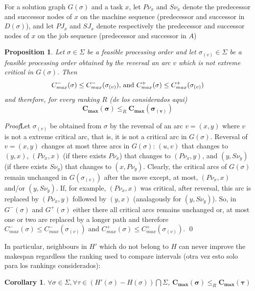 \documentclass[preprint]{elsarticle}
\newtheorem{proposition}{Proposition}
\newtheorem{corollary}{Corollary}
\begin{document}
For a solution graph $G(\sigma)$ and a task $x$, let $P\nu_x$ and $S\nu_x$ denote the predecessor and successor nodes of $x$ on the machine sequence (predecessor and successor in $D(\sigma)$), and let $PJ_x$ and $SJ_x$ denote respectively the predecessor and successor nodes of $x$ on the job sequence (predecessor and successor in $A$)

\begin{proposition}\label{propOutsideH2WorseCmax}
Let $\sigma \in \Sigma$ be a feasible processing order and let $\sigma_{(v)} \in \Sigma$ be a feasible processing order obtained by the reversal an arc $v$ which is not extreme critical in $G(\sigma)$. Then%
\begin{equation}
C_{max}^-(\sigma) \leq C_{max}^-(\sigma_{(v)}) \text{, and }\\
C_{max}^+(\sigma) \leq C_{max}^+(\sigma_{(v)})
\end{equation}
and therefore, for every ranking $R$ (de los considerados aqui)
\begin{equation}
\mathbf{C_{max}(\sigma)} \leq_R \mathbf{C_{max}(\sigma_{(v)})}
\end{equation}
\end{proposition}
\emph{Proof}Let $\sigma_{(v)}$ be obtained from $\sigma$ by the reversal of an arc $v=(x,y)$ where $v$ is not a extreme critical arc, that is, it is not a critical arc in $G(\sigma)$. Reversal of $v=(x,y)$ changes at most three arcs in  $G(\sigma)$: $(u,v)$ that changes to $(y,x)$, $(P\nu_x,x)$ (if there exists $P\nu_x$) that changes to $(P\nu_x,y)$, and $(y,S\nu_y)$ (if there exists $S\nu_y$) that changes to $(x,P\nu_y)$. Clearly, the critical arcs of $G(\sigma)$ remain unchanged in $G(\sigma_{(v)})$ after the move except, at most, $(P\nu_x,x)$ and/or $(y,S\nu_y)$. If, for example, $(P\nu_x,x)$ was critical, after reversal, this arc is replaced by $(P\nu_x,y)$ followed by $(y,x)$ (analagously for $(y,S\nu_y)$). So, in $G^-(\sigma)$ and $G^+(\sigma)$ either there all critical arcs remains unchanged or, at most one or two are replaced by a longer path and therefore $C_{max}^-(\sigma) \leq C_{max}^-(\sigma_{(v)})$ and $C_{max}^+(\sigma) \leq C_{max}^+(\sigma_{(v)})$. \qed

In particular, neighbours in $H'$ which do not belong to $H$ can never improve the makespan regardless the ranking used to compare intervals (otra vez esto solo para los rankings considerados):
\begin{corollary}\label{propH2-H1WorseCmax}
$\forall \sigma \in \Sigma, \forall \tau \in \left( H'(\sigma) - H(\sigma) \right) \bigcap \Sigma$, $\mathbf{C_{max}(\sigma)} \leq_R \mathbf{C_{max}(\tau)}$
\end{corollary}
\end{document}
